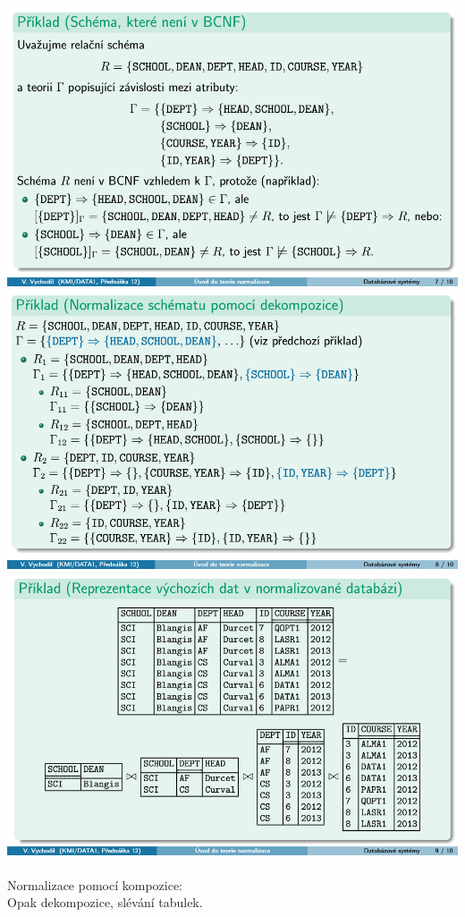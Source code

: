 \documentclass[10pt,a4paper]{article}
\begin{document}
\includegraphics[scale=0.65]{img/sesty_odstavec/schema_obr.png}\\	

\includegraphics[scale=0.65]{img/sesty_odstavec/normalizace_obr.png}\\

\includegraphics[scale=0.65]{img/sesty_odstavec/reprezentace_dat_obr.png}\\\\

 Normalizace pomocí kompozice:\\
 Opak dekompozice, slévání tabulek.
\end{document}
